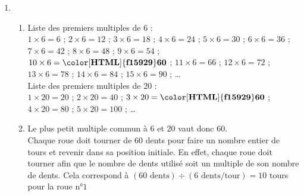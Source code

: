         \begin{enumerate}
            \item
                \begin{enumerate}
                    \item Liste des premiers multiples de $6$ : \\
                    $1\times6 = 6$ ; $2\times6 = 12$ ; $3\times6 = 18$ ; $4\times6 = 24$ ; $5\times6 = 30$ ;
                    $6\times6 = 36$ ; $7\times6 = 42$ ; $8\times6 = 48$ ; $9\times6 = 54$ ; $10\times6 = \mathbf{{\color[HTML]{f15929}60}}$ ;
                    $11\times6 = 66$ ; $12\times6 = 72$ ; $13\times6 = 78$ ; $14\times6 = 84$ ; $15\times6 = 90$ ;
                    \dots \\
                    Liste des premiers multiples de $20$ : \\
                    $1\times20 = 20$ ; $2\times20 = 40$ ; $3\times20 = \mathbf{{\color[HTML]{f15929}60}}$ ; $4\times20 = 80$ ; $5\times20 = 100$ ;
                    \dots \\
                    \medskip
                    \item Le plus petit multiple commun à $6$ et $20$ vaut donc $60$.\\
                    Chaque roue doit tourner de $60$ dents pour faire un nombre entier de tours et revenir dans sa position initiale.
                    En effet, chaque roue doit tourner afin que le nombre de dents utilisé soit un multiple de son nombre de dents.
                    Cela correspond à $(60\text{ dents})\div (6\text{ dents/tour}) = 10$ tours pour la roue n°$1$


\end{enumerate}
\end{enumerate}
